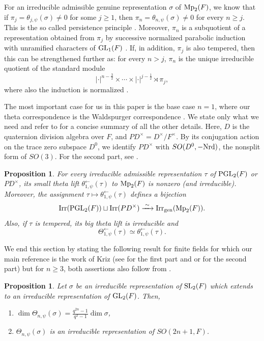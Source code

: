 \documentclass[12pt]{amsart}
\newtheorem{proposition}[theorem]{Proposition}
\theoremstyle{definition}
\theoremstyle{remark}
\begin{document}
For an irreducible admissible genuine representation $\sigma$ of ${\rm Mp}_2(F)$, we know that if $\pi_j=\theta_{j,\psi}(\sigma)\neq0$ for some $j\geq1$, then $\pi_n=\theta_{n,\psi}(\sigma)\neq 0$ for every $n\geq j$. This is the so called persistence principle \cite[Chapter III, \S 4, Proposition 4.1(i)]{kud96}. Moreover, $\pi_n$ is a subquotient of a representation obtained from $\pi_j$ by successive normalized parabolic induction with unramified characters of ${\rm GL}_1(F)$ \cite[Chapter III, \S 4, Proposition 4.1(iii)]{kud96}. If, in addition, $\pi_j$ is also tempered, then this can be strengthened further as: for every $n>j$, $\pi_n$ is the unique irreducible quotient of the standard module
\[
|\cdot|^{n-\frac32}\times\cdots\times
|\cdot|^{j-\frac12}\rtimes\pi_j,
\]
where also the induction is normalized \cite[Proposition 3.2]{gt16}.

The most important case for us in this paper is the base case $n=1$, where our theta correspondence is the Waldspurger correspondence \cite{wal80,wal91}. We state only what we need and refer to \cite[\S 5]{gs12} for a concise summary of all the other details. 
Here, $D$ is the quaternion division algebra over $F$, and $PD^\times=D^\times/F^\times$. By its conjugation action on the trace zero subspace $D^0$, we identify $PD^\times$ with $SO(D^0,-{\rm Nrd})$, the nonsplit form of $SO(3)$. For the second part, see \cite[Theorem 8.1(ii)]{gs12}.

\begin{proposition}\label{prop-waldspurger}
For every irreducible
admissible representation $\tau$ of ${\rm PGL}_2(F)$ or $PD^\times$,
its small theta lift $\theta_{1,\psi}^{\leftarrow}(\tau)$ to ${\rm Mp}_2(F)$ is
nonzero (and irreducible). Moreover, the assignment
$\tau\mapsto \theta_{1,\psi}^{\leftarrow}(\tau)$ defines a bijection
\[
{\rm Irr}({\rm PGL}_2(F))
\sqcup
{\rm Irr}(PD^\times)
\xrightarrow{\;\sim\;}
{\rm Irr}_{\rm gen}({\rm Mp}_2(F)).
\]
Also, if $\tau$ is tempered, its big theta lift is irreducible and
\[
\Theta^{\leftarrow}_{1,\psi}(\tau)
\simeq
\theta^{\leftarrow}_{1,\psi}(\tau).
\]
\end{proposition}

We end this section by stating the following result for finite fields for which our main reference is the work of Kriz (see \cite[\S 6]{kri25} for the first part and \cite[Theorem 1 (2)]{kri25} or \cite[Theorem 2 (2)]{kri24} for the second part) but for $n\ge3$, both assertions also follow from \cite[Proposition 5.7 ~\&~ Table I]{lost10}.
\begin{proposition}\label{kriz}
Let $\sigma$ be an irreducible representation of ${\rm SL}_2(F)$ which extends to an irreducible representation of ${\rm GL}_2(F)$. Then,
\begin{enumerate}
\item $\dim \Theta_{n,\psi}(\sigma) = \frac{q^{2n}-1}{q^2-1}\dim \sigma$,
\item $\Theta_{n,\psi}(\sigma)$ is an irreducible representation of $SO(2n+1,F)$.
\end{enumerate}
\end{proposition}
\end{document}
